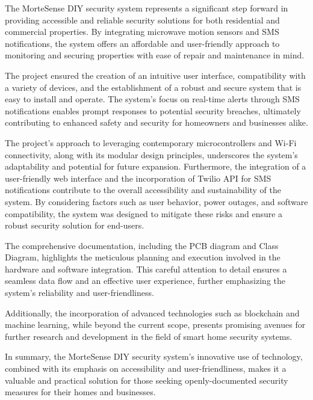 \documentclass[conference]{IEEEtran}
\begin{document}
The MorteSense DIY security system represents a significant step forward in providing
accessible and reliable security solutions for both residential and commercial properties.
By integrating microwave motion sensors and SMS notifications, the system offers an
affordable and user-friendly approach to monitoring and securing properties with ease of
repair and maintenance in mind.

The project ensured the creation of an intuitive user interface, compatibility with a variety
of devices, and the establishment of a robust and secure system that is easy to install and operate.
The system's focus on real-time alerts through SMS notifications enables prompt responses to
potential security breaches, ultimately contributing to enhanced safety and security for
homeowners and businesses alike.

The project's approach to leveraging contemporary microcontrollers and Wi-Fi connectivity, along
with its modular design principles, underscores the system's adaptability and potential for
future expansion. Furthermore, the integration of a user-friendly web interface and the
incorporation of Twilio API for SMS notifications contribute to the overall accessibility
and sustainability of the system. By considering factors such as user behavior, power outages,
and software compatibility, the system was designed to mitigate these risks and ensure a
robust security solution for end-users.

The comprehensive documentation, including the PCB diagram and Class Diagram, highlights the
meticulous planning and execution involved in the hardware and software integration. This
careful attention to detail ensures a seamless data flow and an effective user experience,
further emphasizing the system's reliability and user-friendliness.

Additionally, the incorporation of advanced technologies such as blockchain and machine
learning, while beyond the current scope, presents promising avenues for further
research and development in the field of smart home security systems.

In summary, the MorteSense DIY security system's innovative use of technology, combined with
its emphasis on accessibility and user-friendliness, makes it a valuable and practical
solution for those seeking openly-documented security measures for their homes and businesses.



\end{document}
